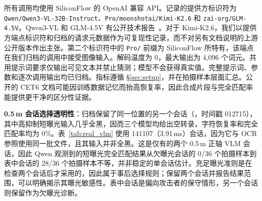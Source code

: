 \documentclass{ieeeaccess}
\begin{document}
所有调用均使用 SiliconFlow 的 OpenAI 兼容 API。记录的提供方标识符为 \texttt{Qwen/\allowbreak Qwen3-\allowbreak VL-\allowbreak 32B-\allowbreak Instruct}、\texttt{Pro/\allowbreak moonshotai/\allowbreak Kimi-\allowbreak K2.6} 和 \texttt{zai-\allowbreak org/\allowbreak GLM-\allowbreak 4.5V}。Qwen3-VL 和 GLM-4.5V 有公开技术报告~\cite{b_qwen3vl2025,b_glm45v2025}。对于 Kimi-K2.6，我们以提供方端点标识符和归档的请求元数据作为可复现性记录，而不对另有文档说明的上游公开版本作出主张。第二个标识符中的 \texttt{Pro/} 前缀为 SiliconFlow 所特有，该端点在我们归档的调用中接受图像输入。解码温度为 0，最大输出为 4,096 个词元。共用提示词要求仅输出可见文本并禁止猜测；模型不会获得真实值。完整提示词、参数和逐次调用输出均已归档。指标遵循 \S\ref{sec:setup}，并在拍摄样本层面汇总。公开的 CET6 文档可能因训练数据记忆而抬高恢复率，因此合成片段与完全匹配率能提供更干净的区分性证据。

\textbf{0.5\,m 会话选择透明性}：归档保留了同一位置的另一个会话（，时间戳 012715），其中高抑制短曝光输入几乎全黑，因而三个模型均给出空转录，字符恢复率和完全匹配率均为 0\%。表~\ref{tab:real_vlm} 使用 141107（3.91\,ms）会话，因为它与 OCR 参照使用同一批文件，且其输入并非全黑。这是仅有的两个 0.5\,m 正轴 VLM 会话，因此 Qwen 观测到的短曝光完全匹配结果从欠曝光会话的 0/36 个拍摄样本到表中会话的 28/36 个拍摄样本不等，并非稳定的单会话估计。充足曝光准则是在检查两个会话后才采用的，因此属于事后选择规则；保留两个会话并报告结果范围，可以明确揭示其曝光敏感性。表中会话是偏向攻击者的保守情形，另一个会话则保留作为欠曝光诊断。
\end{document}
